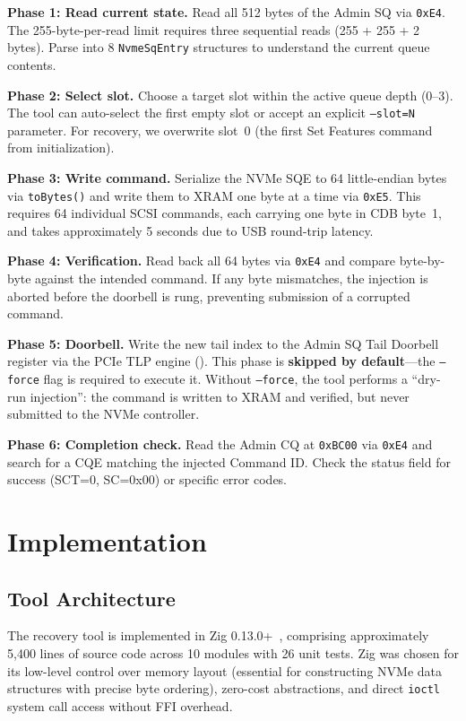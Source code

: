 \documentclass[conference]{IEEEtran}
\begin{document}
\noindent\textbf{Phase 1: Read current state.} Read all 512 bytes of the
Admin SQ via \texttt{0xE4}. The 255-byte-per-read limit requires three
sequential reads (255 + 255 + 2 bytes). Parse into 8
\texttt{NvmeSqEntry} structures to understand the current queue
contents.

\noindent\textbf{Phase 2: Select slot.} Choose a target slot within the
active queue depth (0--3). The tool can auto-select the first empty slot
or accept an explicit \texttt{--slot=N} parameter. For recovery, we
overwrite slot~0 (the first Set Features command from initialization).

\noindent\textbf{Phase 3: Write command.} Serialize the NVMe SQE to 64
little-endian bytes via \texttt{toBytes()} and write them to XRAM one
byte at a time via \texttt{0xE5}. This requires 64 individual SCSI
commands, each carrying one byte in CDB byte~1, and takes approximately
5 seconds due to USB round-trip latency.

\noindent\textbf{Phase 4: Verification.} Read back all 64 bytes via
\texttt{0xE4} and compare byte-by-byte against the intended command. If
any byte mismatches, the injection is aborted before the doorbell is
rung, preventing submission of a corrupted command.

\noindent\textbf{Phase 5: Doorbell.} Write the new tail index to the
Admin SQ Tail Doorbell register via the PCIe TLP engine
(). This phase is \textbf{skipped by default}---the
\texttt{--force} flag is required to execute it. Without
\texttt{--force}, the tool performs a ``dry-run injection'': the command
is written to XRAM and verified, but never submitted to the NVMe
controller.

\noindent\textbf{Phase 6: Completion check.} Read the Admin CQ at
\texttt{0xBC00} via \texttt{0xE4} and search for a CQE matching the
injected Command ID. Check the status field for success
(SCT=0, SC=0x00) or specific error codes.


\section{Implementation}
\label{sec:impl}

\subsection{Tool Architecture}
\label{sec:architecture}

The recovery tool is implemented in Zig 0.13.0+~\cite{zig-lang},
comprising approximately 5,400 lines of source code across 10 modules
with 26 unit tests. Zig was chosen for its low-level control over memory
layout (essential for constructing NVMe data structures with precise byte
ordering), zero-cost abstractions, and direct \texttt{ioctl} system call
access without FFI overhead.
\end{document}
